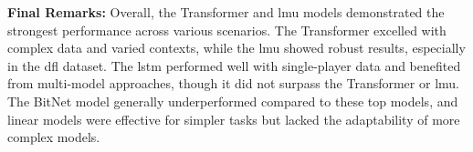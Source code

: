 \textbf{Final Remarks:}
Overall, the Transformer and \gls{lmu} models demonstrated the strongest performance across various scenarios. The Transformer excelled with complex data and varied contexts, while the \gls{lmu} showed robust results, especially in the \gls{dfl} dataset. The \gls{lstm} performed well with single-player data and benefited from multi-model approaches, though it did not surpass the Transformer or \gls{lmu}. The BitNet model generally underperformed compared to these top models, and linear models were effective for simpler tasks but lacked the adaptability of more complex models.
